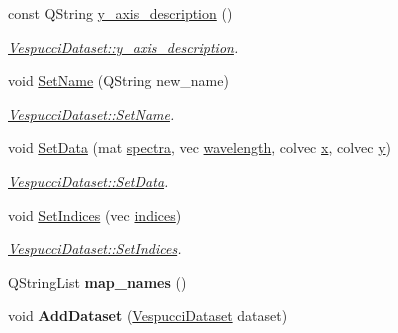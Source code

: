 \begin{DoxyCompactItemize}
const Q\+String \hyperlink{class_vespucci_dataset_ae49a51e6e1666cea514bec6bf5578405}{y\+\_\+axis\+\_\+description} ()
\begin{DoxyCompactList}\small\item\em \hyperlink{class_vespucci_dataset_ae49a51e6e1666cea514bec6bf5578405}{Vespucci\+Dataset\+::y\+\_\+axis\+\_\+description}. \end{DoxyCompactList}\item 
void \hyperlink{class_vespucci_dataset_aa35196b0c4fb0617d7ffd9545b9119b3}{Set\+Name} (Q\+String new\+\_\+name)
\begin{DoxyCompactList}\small\item\em \hyperlink{class_vespucci_dataset_aa35196b0c4fb0617d7ffd9545b9119b3}{Vespucci\+Dataset\+::\+Set\+Name}. \end{DoxyCompactList}\item 
void \hyperlink{class_vespucci_dataset_a6deccc4fb8829e27a68289e07a294f90}{Set\+Data} (mat \hyperlink{class_vespucci_dataset_a536a8837c5a2ad10a0bb3577f8741ee2}{spectra}, vec \hyperlink{class_vespucci_dataset_ab43f057969b6603cbc46f8e9356b9b56}{wavelength}, colvec \hyperlink{class_vespucci_dataset_aa7f8bd75b05670da47cb453b5350110b}{x}, colvec \hyperlink{class_vespucci_dataset_a83f8c7559de5e723073979f5556174fd}{y})
\begin{DoxyCompactList}\small\item\em \hyperlink{class_vespucci_dataset_a6deccc4fb8829e27a68289e07a294f90}{Vespucci\+Dataset\+::\+Set\+Data}. \end{DoxyCompactList}\item 
void \hyperlink{class_vespucci_dataset_ac3d023864da930929b3491ef0d4ec14b}{Set\+Indices} (vec \hyperlink{class_vespucci_dataset_a7472b4eb9f6ea7245ed544287ebe4a8b}{indices})
\begin{DoxyCompactList}\small\item\em \hyperlink{class_vespucci_dataset_ac3d023864da930929b3491ef0d4ec14b}{Vespucci\+Dataset\+::\+Set\+Indices}. \end{DoxyCompactList}\item 
\hypertarget{class_vespucci_dataset_adcab2eab5d82f74232c8d706aa67dbf5}{Q\+String\+List {\bfseries map\+\_\+names} ()}\label{class_vespucci_dataset_adcab2eab5d82f74232c8d706aa67dbf5}

\item 
\hypertarget{class_vespucci_dataset_a1d728faac400905bef4fa437e089c987}{void {\bfseries Add\+Dataset} (\hyperlink{class_vespucci_dataset}{Vespucci\+Dataset} dataset)}\label{class_vespucci_dataset_a1d728faac400905bef4fa437e089c987}


\end{DoxyCompactItemize}
